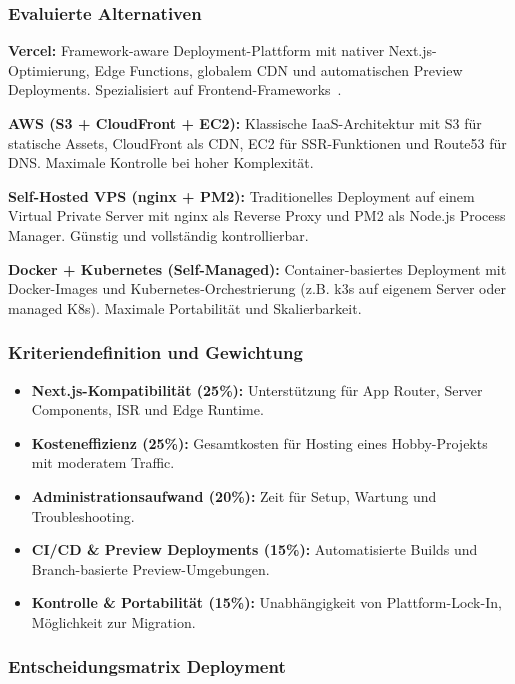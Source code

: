 \subsubsection{Evaluierte Alternativen}

\textbf{Vercel:} Framework-aware Deployment-Plattform mit nativer Next.js-Optimierung, Edge Functions, globalem \ac{CDN} und automatischen Preview Deployments. Spezialisiert auf Frontend-Frameworks~\cite{vercel2024}.

\textbf{AWS (S3 + CloudFront + EC2):} Klassische \ac{IaaS}-Architektur mit S3 für statische Assets, CloudFront als \ac{CDN}, EC2 für SSR-Funktionen und Route53 für DNS. Maximale Kontrolle bei hoher Komplexität.

\textbf{Self-Hosted VPS (nginx + PM2):} Traditionelles Deployment auf einem Virtual Private Server mit nginx als Reverse Proxy und PM2 als Node.js Process Manager. Günstig und vollständig kontrollierbar.

\textbf{Docker + Kubernetes (Self-Managed):} Container-basiertes Deployment mit Docker-Images und Kubernetes-Orchestrierung (z.B. k3s auf eigenem Server oder managed K8s). Maximale Portabilität und Skalierbarkeit.

\subsubsection{Kriteriendefinition und Gewichtung}

\begin{itemize}
    \item \textbf{Next.js-Kompatibilität (25\%):} Unterstützung für App Router, Server Components, \ac{ISR} und Edge Runtime.
    \item \textbf{Kosteneffizienz (25\%):} Gesamtkosten für Hosting eines Hobby-Projekts mit moderatem Traffic.
    \item \textbf{Administrationsaufwand (20\%):} Zeit für Setup, Wartung und Troubleshooting.
    \item \textbf{CI/CD \& Preview Deployments (15\%):} Automatisierte Builds und Branch-basierte Preview-Umgebungen.
    \item \textbf{Kontrolle \& Portabilität (15\%):} Unabhängigkeit von Plattform-Lock-In, Möglichkeit zur Migration.
\end{itemize}

\subsubsection{Entscheidungsmatrix Deployment}

